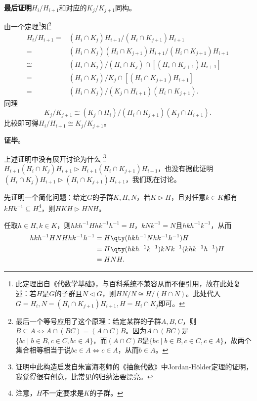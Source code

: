 \textbf{最后证明}$H_i/H_{i+1}$和对应的$K_j/K_{j+1}$同构。

由一个定理\footnote{此定理出自《代数学基础》，与百科系统不兼容从而不便引用，故在此处复述：若$H$是$G$的子群且$N\lhd G$，则$HN/N\cong H/(H\cap N)$。此处代入$G=H_i, N=(H_i\cap K_{j+1})H_{i+1}, H=H_i\cap K_j$即可。}知\footnote{最后一个等号应用了这个原理：给定某群的子群$A, B, C$，则$B\subseteq A \iff A\cap(BC)=(A\cap C)B$。因为$A\cap (BC)$是$\{bc\mid b\in B, c\in C, bc\in A\}$，而$(A\cap C)B$是$\{bc\mid b\in B, c\in C, c\in A\}$，故两个集合相等相当于说$bc\in A\iff c\in A$，从而$b\in A$。}
\begin{equation}
    \begin{aligned}
    H_i/H_{i+1} ={}& (H_i\cap K_j)H_{i+1} / (H_i\cap K_{j+1})H_{i+1}\\
    ={}& (H_i\cap K_j)(H_i\cap K_{j+1})H_{i+1} / (H_i\cap K_{j+1})H_{i+1}\\
    \cong{}& (H_i\cap K_j) / (H_i\cap K_j)\cap[(H_i\cap K_{j+1})H_{i+1}]\\
    ={}& (H_i\cap K_j) / K_j\cap[(H_i\cap K_{j+1})H_{i+1}]\\
    ={}& (H_i\cap K_j) / (K_j\cap H_{i+1})(H_i\cap K_{j+1}). 
    \end{aligned}
~\end{equation}
同理
\begin{equation}
    K_j/K_{j+1} \cong (K_j\cap H_i)/(H_i\cap K_{j+1})(K_j\cap H_{i+1}). 
~\end{equation}
比较即可得$H_i/H_{i+1} \cong K_j/K_{j+1}$。



\textbf{证毕}。



上述证明中没有展开讨论为什么
\footnote{证明中此构造启发自朱富海老师的《抽象代数》中Jordan-Hölder定理的证明，我觉得很有创意，比常见的归纳法要漂亮。}
$H_{i+1}(H_i\cap K_j)H_{i+1}\rhd H_{i+1}(H_i\cap K_{j+1})H_{i+1}$，也没有据此证明$(H_i\cap K_{j})H_{i+1}\rhd (H_i\cap K_{j+1})H_{i+1}$，我们现在讨论。

先证明一个简化问题：给定$G$的子群$K, H, N$，若$K\rhd H$，且对任意$k\in K$都有$kHk^{-1}\subseteq H$\footnote{注意，$H$不一定要求是$K$的子群。}，则$HKH\rhd HNH$。

任取$h\in H, k\in K$，则$hkh^{-1} H hk^{-1}h^{-1}=H$，$kNk^{-1}=N$且$hkh^{-1}k^{-1}$，从而
\begin{equation}
    \begin{aligned}
    hkh^{-1} HNH hk^{-1}h^{-1} ={}&  H\qty(hkh^{-1} N hk^{-1}h^{-1})H\\
    ={}& H\qty(hkh^{-1} k^{-1} )k N k^{-1} (k hk^{-1}h^{-1})H\\
    ={}& HNH. 
    \end{aligned}~
\end{equation}

